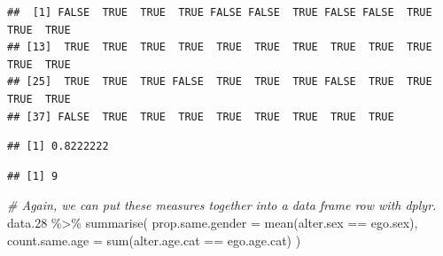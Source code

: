 \documentclass[
]{book}
\newenvironment{Shaded}{\begin{snugshade}}{\end{snugshade}}
\newcommand{\AttributeTok}[1]{\textcolor[rgb]{0.77,0.63,0.00}{#1}}
\newcommand{\CommentTok}[1]{\textcolor[rgb]{0.56,0.35,0.01}{\textit{#1}}}
\newcommand{\FloatTok}[1]{\textcolor[rgb]{0.00,0.00,0.81}{#1}}
\newcommand{\FunctionTok}[1]{\textcolor[rgb]{0.00,0.00,0.00}{#1}}
\newcommand{\NormalTok}[1]{#1}
\newcommand{\SpecialCharTok}[1]{\textcolor[rgb]{0.00,0.00,0.00}{#1}}
\begin{document}
\begin{Shaded}
\end{Shaded}

\begin{verbatim}
##  [1] FALSE  TRUE  TRUE  TRUE FALSE FALSE  TRUE FALSE FALSE  TRUE  TRUE  TRUE
## [13]  TRUE  TRUE  TRUE  TRUE  TRUE  TRUE  TRUE  TRUE  TRUE  TRUE  TRUE  TRUE
## [25]  TRUE  TRUE  TRUE FALSE  TRUE  TRUE  TRUE FALSE  TRUE  TRUE  TRUE  TRUE
## [37] FALSE  TRUE  TRUE  TRUE  TRUE  TRUE  TRUE  TRUE  TRUE
\end{verbatim}

\begin{Shaded}
\end{Shaded}

\begin{verbatim}
## [1] 0.8222222
\end{verbatim}

\begin{Shaded}
\end{Shaded}

\begin{verbatim}
## [1] 9
\end{verbatim}

\begin{Shaded}
\begin{Highlighting}[]
\CommentTok{\# Again, we can put these measures together into a data frame row with dplyr.}
\NormalTok{data}\FloatTok{.28} \SpecialCharTok{\%\textgreater{}\%}
  \FunctionTok{summarise}\NormalTok{(}
    \AttributeTok{prop.same.gender =} \FunctionTok{mean}\NormalTok{(alter.sex }\SpecialCharTok{==}\NormalTok{ ego.sex), }
    \AttributeTok{count.same.age =} \FunctionTok{sum}\NormalTok{(alter.age.cat }\SpecialCharTok{==}\NormalTok{ ego.age.cat)}
\NormalTok{  )}
\end{Highlighting}
\end{Shaded}
\end{document}
